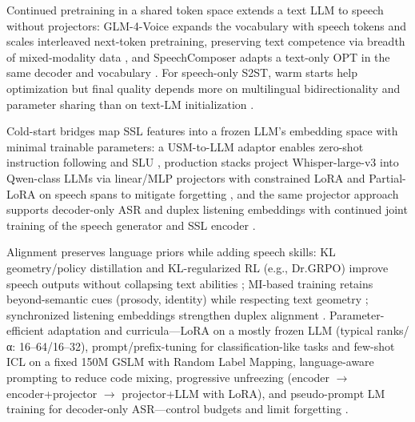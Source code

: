 \documentclass{article}
\begin{document}
Continued pretraining in a shared token space extends a text LLM to speech without projectors: GLM-4-Voice expands the vocabulary with speech tokens and scales interleaved next-token pretraining, preserving text competence via breadth of mixed-modality data \cite{zeng2024scalingspeechtextpretrainingsyntheticint}, and SpeechComposer adapts a text-only OPT in the same decoder and vocabulary \cite{wu2024speechcomposerunifyingmultiplespeechtask}. For speech-only S2ST, warm starts help optimization but final quality depends more on multilingual bidirectionality and parameter sharing than on text-LM initialization \cite{peng2024mslms2stmultitaskspeechlanguagemodeltext}.

Cold-start bridges map SSL features into a frozen LLM's embedding space with minimal trainable parameters: a USM-to-LLM adaptor enables zero-shot instruction following and SLU \cite{wang2023slmbridgethingapbetweenspeechtextfoundat}, production stacks project Whisper-large-v3 into Qwen-class LLMs via linear/MLP projectors with constrained LoRA and Partial-LoRA on speech spans to mitigate forgetting \cite{wang2024blspemotowardsempatheticlargespeechlangu}, and the same projector approach supports decoder-only ASR and duplex listening embeddings with continued joint training of the speech generator and SSL encoder \cite{tsunoo2024decoderonlyarchitecturespeechrecognition,ma2024languagemodelcanlistenwhilespeaking}.

Alignment preserves language priors while adding speech skills: KL geometry/policy distillation and KL-regularized RL (e.g., Dr.GRPO) improve speech outputs without collapsing text abilities \cite{wang2024blspemotowardsempatheticlargespeechlangu,li2025seewossubmissionmlcslmlessonslearnedspee}; MI-based training retains beyond-semantic cues (prosody, identity) while respecting text geometry \cite{wang2025bossbeyondsemanticspeech}; synchronized listening embeddings strengthen duplex alignment \cite{ma2024languagemodelcanlistenwhilespeaking}. Parameter-efficient adaptation and curricula---LoRA on a mostly frozen LLM (typical ranks/α: 16--64/16--32), prompt/prefix-tuning for classification-like tasks and few-shot ICL on a fixed 150M GSLM with Random Label Mapping, language-aware prompting to reduce code mixing, progressive unfreezing (encoder $\rightarrow$ encoder+projector $\rightarrow$ projector+LLM with LoRA), and pseudo-prompt LM training for decoder-only ASR---control budgets and limit forgetting \cite{hsu2024exploringcontextlearningtextlessspeechla,li2025seewossubmissionmlcslmlessonslearnedspee,nguyen2025qwenvsgemmaintegrationwhispercomparative,tsunoo2024decoderonlyarchitecturespeechrecognition}.
\end{document}

